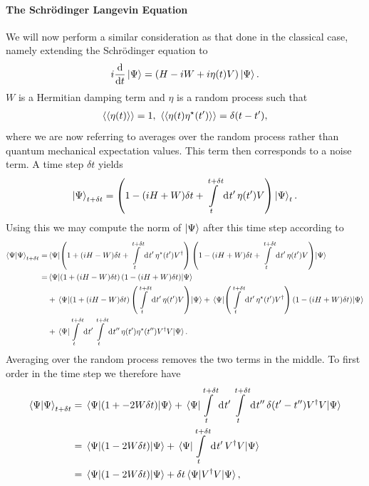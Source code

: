 \paragraph{The Schrödinger Langevin Equation}
We will now perform a similar consideration as that done in the classical case, namely extending the Schrödinger equation to
\begin{align*}
	i\dv{t}\ket{\Psi} = (H - iW + i\eta(t)V)\ket{\Psi}.
\end{align*}
$W$ is a Hermitian damping term and $\eta$ is a random process such that
\begin{align*}
	\expval{\expval{\eta(t)}} = 1,\ \expval{\expval{\eta(t)\eta\cc(t\p)}} = \delta(t - t\p),
\end{align*}
where we are now referring to averages over the random process rather than quantum mechanical expectation values. This term then corresponds to a noise term. A time step $\delta t$ yields
\begin{align*}
	\ket{\Psi}_{t + \delta t} = \left(1 - (iH + W)\delta t + \int\limits_{t}^{t + \delta t}\dd[]{t\ensuremath{^{\prime}}}\eta(t^{\prime})V\right)\ket{\Psi}_{t}.
\end{align*}
Using this we may compute the norm of $\ket{\Psi}$ after this time step according to
\begin{align*}
	\braket{\Psi}_{t + \delta t} =& \expval{\left(1 + (iH - W)\delta t + \int\limits_{t}^{t + \delta t}\dd[]{t\ensuremath{^{\prime}}}\eta\ensuremath{^{\star}}(t\ensuremath{^{\prime}})V\ensuremath{^{\dagger}}\right)\left(1 - (iH + W)\delta t + \int\limits_{t}^{t + \delta t}\dd[]{t\ensuremath{^{\prime}}}\eta(t\ensuremath{^{\prime}})V\right)}{\Psi} \\
	                             =& \expval{\left(1 + (iH - W)\delta t\right)\left(1 - (iH + W)\delta t\right)}{\Psi} \\
	                              &+ \expval{\left(1 + (iH - W)\delta t\right)\left(\int\limits_{t}^{t + \delta t}\dd[]{t\ensuremath{^{\prime}}}\eta(t\ensuremath{^{\prime}})V\right)}{\Psi} + \expval{\left(\int\limits_{t}^{t + \delta t}\dd[]{t\ensuremath{^{\prime}}}\eta\ensuremath{^{\star}}(t\ensuremath{^{\prime}})V\ensuremath{^{\dagger}}\right)\left(1 - (iH + W)\delta t\right)}{\Psi} \\
	                              &+ \expval{\int\limits_{t}^{t + \delta t}\dd[]{t\ensuremath{^{\prime}}}\int\limits_{t}^{t + \delta t}\dd[]{t^{\prime\prime}}\eta(t\ensuremath{^{\prime}})\eta\ensuremath{^{\star}}(t^{\prime\prime})V\ensuremath{^{\dagger}}V}{\Psi}.
\end{align*}
Averaging over the random process removes the two terms in the middle. To first order in the time step we therefore have
\begin{align*}
	\braket{\Psi}_{t + \delta t} &= \expval{\left(1 + -2W\delta t\right)}{\Psi} + \expval{\int\limits_{t}^{t + \delta t}\dd[]{t\ensuremath{^{\prime}}}\int\limits_{t}^{t + \delta t}\dd[]{t^{\prime\prime}}\delta(t\ensuremath{^{\prime}}- t^{\prime\prime})V\ensuremath{^{\dagger}}V}{\Psi} \\
	                             &= \expval{\left(1 - 2W\delta t\right)}{\Psi} + \expval{\int\limits_{t}^{t + \delta t}\dd[]{t\ensuremath{^{\prime}}}V\ensuremath{^{\dagger}}V}{\Psi} \\
	                             &= \expval{\left(1 - 2W\delta t\right)}{\Psi} + \delta t\expval{V\ensuremath{^{\dagger}}V}{\Psi},
\end{align*}
